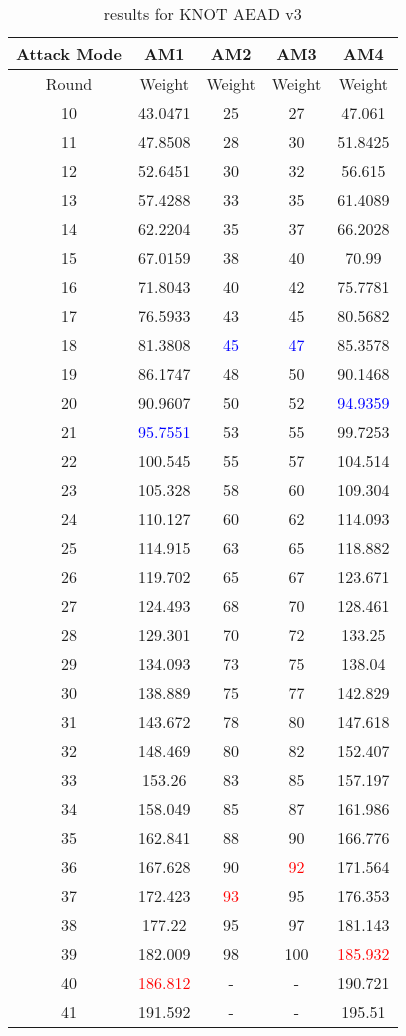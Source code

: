 \begin{table}
	\caption{results for KNOT AEAD v3}\label{tab:knot-aead-v3}
	\centering
	\begin{tabular}{|c|c|c|c|c|}
		\hline
		Attack Mode & AM1 & AM2 & AM3 & AM4\\
		\hline
		Round & Weight & Weight & Weight & Weight\\
		\hline
		10 & 43.0471 & 25 & 27 & 47.061\\
		11 & 47.8508 & 28 & 30 & 51.8425\\
		12 & 52.6451 & 30 & 32 & 56.615\\
		13 & 57.4288 & 33 & 35 & 61.4089\\
		14 & 62.2204 & 35 & 37 & 66.2028\\
		15 & 67.0159 & 38 & 40 & 70.99\\
		16 & 71.8043 & 40 & 42 & 75.7781\\
		17 & 76.5933 & 43 & 45 & 80.5682\\
		18 & 81.3808 & \textcolor{blue}{45} & \textcolor{blue}{47} & 85.3578\\
		19 & 86.1747 & 48 & 50 & 90.1468\\
		20 & 90.9607 & 50 & 52 & \textcolor{blue}{94.9359}\\
		21 & \textcolor{blue}{95.7551} & 53 & 55 & 99.7253\\
		22 & 100.545 & 55 & 57 & 104.514\\
		23 & 105.328 & 58 & 60 & 109.304\\
		24 & 110.127 & 60 & 62 & 114.093\\
		25 & 114.915 & 63 & 65 & 118.882\\
		26 & 119.702 & 65 & 67 & 123.671\\
		27 & 124.493 & 68 & 70 & 128.461\\
		28 & 129.301 & 70 & 72 & 133.25\\
		29 & 134.093 & 73 & 75 & 138.04\\
		30 & 138.889 & 75 & 77 & 142.829\\
		31 & 143.672 & 78 & 80 & 147.618\\
		32 & 148.469 & 80 & 82 & 152.407\\
		33 & 153.26 & 83 & 85 & 157.197\\
		34 & 158.049 & 85 & 87 & 161.986\\
		35 & 162.841 & 88 & 90 & 166.776\\
		36 & 167.628 & 90 & \textcolor{red}{92} & 171.564\\
		37 & 172.423 & \textcolor{red}{93} & 95 & 176.353\\
		38 & 177.22 & 95 & 97 & 181.143\\
		39 & 182.009 & 98 & 100 & \textcolor{red}{185.932}\\
		40 & \textcolor{red}{186.812} & - & - & 190.721\\
		41 & 191.592 & - & - & 195.51\\
		\hline
	\end{tabular}
\end{table}

